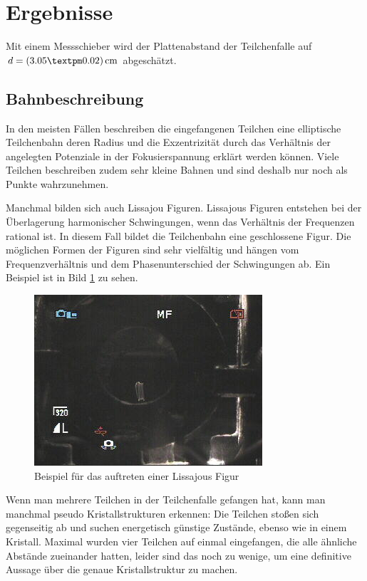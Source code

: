 \documentclass[a4paper,12pt]{article}
\begin{document}
\section{Ergebnisse}
Mit einem Messschieber wird der Plattenabstand der Teilchenfalle auf $d = \unit[(3.05±0.02)]{cm}$ abgeschätzt.
\subsection{Bahnbeschreibung}
In den meisten Fällen beschreiben die eingefangenen Teilchen eine elliptische Teilchenbahn deren Radius und die Exzentrizität durch das Verhältnis der angelegten Potenziale in der Fokusierspannung erklärt werden können.
Viele Teilchen beschreiben zudem sehr kleine Bahnen und sind deshalb nur noch als Punkte wahrzunehmen.

Manchmal bilden sich auch Lissajou Figuren. Lissajous Figuren entstehen bei der Überlagerung harmonischer Schwingungen, wenn das Verhältnis der Frequenzen rational ist.
In diesem Fall bildet die Teilchenbahn eine geschlossene Figur.
Die möglichen Formen der Figuren sind sehr vielfältig und hängen vom Frequenzverhältnis und dem Phasenunterschied der Schwingungen ab.
Ein Beispiel ist in Bild \ref{Lissjous} zu sehen.

\begin{figure}[htb]
		\centering
		\includegraphics{lisa1.jpg}
		\caption{Beispiel für das auftreten einer Lissajous Figur}
		\label{Lissjous}
\end{figure}

Wenn man mehrere Teilchen in der Teilchenfalle gefangen hat, kann man manchmal pseudo Kristallstrukturen erkennen:
Die Teilchen stoßen sich gegenseitig ab und suchen energetisch günstige Zustände, ebenso wie in einem Kristall.
Maximal wurden vier Teilchen auf einmal eingefangen, die alle ähnliche Abstände zueinander hatten, leider sind das noch zu wenige, um eine definitive Aussage über die genaue Kristallstruktur zu machen.
\end{document}
